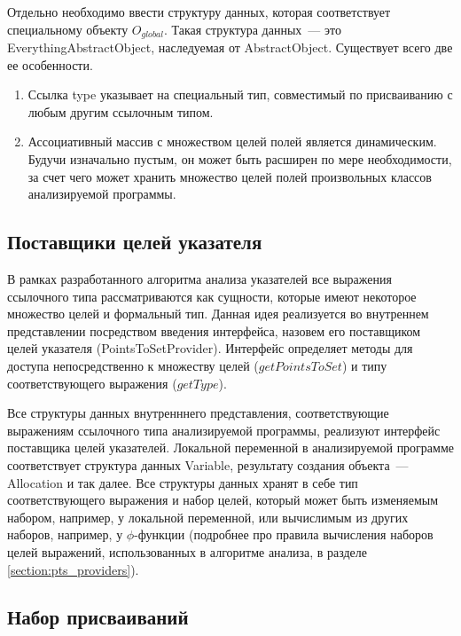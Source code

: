 \documentclass[14pt,titlepage]{extarticle}
\let\oldphi\phi
\renewcommand{\phi}{\ensuremath{\oldphi}}
\newcommand{\eng}[1]{{\English#1}}
\begin{document}
      Отдельно необходимо ввести структуру данных, которая соответствует
      специальному объекту $O_{global}$. Такая структура данных~--- это
      \eng{Everything\-Abstract\-Object}, наследуемая от \eng{AbstractObject}.
      Существует всего две ее особенности.
      \begin{enumerate}
        \item Ссылка \eng{type} указывает на специальный тип, совместимый по
              присваиванию с любым другим ссылочным типом.
        \item Ассоциативный массив с множеством целей полей является
              динамическим. Будучи изначально пустым, он может быть расширен
              по мере необходимости, за счет чего может хранить множество целей
              полей произвольных классов анализируемой программы.
      \end{enumerate}

    \subsection{Поставщики целей указателя}

      В рамках разработанного алгоритма анализа указателей все выражения
      ссылочного типа рассматриваются как сущности, которые имеют некоторое
      множество целей и формальный тип.
      Данная идея реализуется во внутреннем представлении посредством введения
      интерфейса, назовем его поставщиком целей указателя
      (\eng{PointsToSetProvider}).
      Интерфейс определяет методы для доступа непосредственно к множеству целей
      ($getPointsToSet$) и типу соответствующего выражения ($getType$).

      Все структуры данных внутренннего представления, соответствующие выражениям
      ссылочного типа анализируемой программы, реализуют интерфейс поставщика
      целей указателей.
      Локальной переменной в анализируемой программе соответствует структура
      данных \eng{Variable}, результату создания объекта~--- \eng{Allocation} и
      так далее.
      Все структуры данных хранят в себе тип соответствующего выражения и набор
      целей, который может быть изменяемым набором, например, у локальной
      переменной, или вычислимым из других наборов, например, у \phi-функции
      (подробнее про правила вычисления наборов целей выражений, использованных
      в алгоритме анализа, в разделе \ref{section:pts_providers}).

    \subsection{Набор присваиваний}
\end{document}
